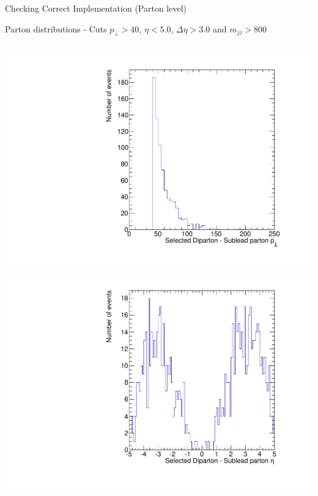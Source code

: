 \documentclass[8pt]{beamer}
\begin{document}
\begin{frame}{Checking Correct Implementation (Parton level)}
\begin{block}{Parton distributions - Cuts $p_\perp>40$, $\eta<5.0$, $\Delta\eta>3.0$ and $m_{jj}>800$}
\begin{columns}
  \centering
  \includegraphics[width=0.8\linewidth]{img/SelDiParton_Parton2_Pt.pdf} \\
  \includegraphics[width=0.8\linewidth]{img/SelDiParton_Parton2_Eta.pdf}


\end{columns}
\end{block}
\end{frame}
\end{document}
